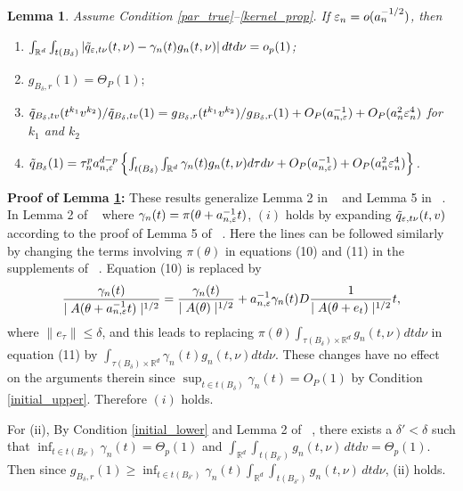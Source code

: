 \documentclass{article}
\newtheorem{lemma}{Lemma}
\begin{document}
\begin{lemma}\label{Alemma2} Assume Condition \ref{par_true}--\ref{kernel_prop}. If $\varepsilon_{n}=o(a_{n}^{-1/2})$, then 
	\begin{enumerate}
		\item[(i)] $\int_{\mathbb{R}^{d}}\int_{t(B_{\delta})}|\tilde{q}_{\varepsilon,t\nu}(t,\nu)-\gamma_{n}(t)g_{n}(t,\nu)|\,dtd\nu=o_{p}(1)$;
		\item[(ii)] $g_{B_{\delta},r}(1)=\Theta_{P}(1);$ 
		\item[(iii)] $\tilde{q}_{B_{\delta},tv}(t^{k_{1}}v^{k_{2}})/\tilde{q}_{B_{\delta},tv}(1)=g_{B_{\delta},r}(t^{k_{1}}v^{k_{2}})/g_{B_{\delta},r}(1)+O_{P}(a_{n,\varepsilon}^{-1})+O_{P}(a_{n}^{2}\varepsilon_{n}^{4})$
		for $k_{1}$ and $k_{2}$ 
		\item[(iv)] $\tilde{q}_{B_{\delta}}(1)=\tau_{n}^{p}a_{n,\varepsilon}^{d-p}\left\{ \int_{t(B_{\delta})}\int_{\mathbb{R}^{d}}\gamma_{n}(t)g_{n}(t,\nu)d\tau d\nu+O_{P}(a_{n,\varepsilon}^{-1})+O_{P}(a_{n}^{2}\varepsilon_{n}^{4})\right\} $. 
	\end{enumerate}\end{lemma}
{\bf Proof of Lemma \ref{Alemma2}:} 
	These results generalize Lemma 2 in ~\cite{Li2017} and Lemma 5 in
	~\cite{Li2016}. In Lemma 2 of ~\cite{Li2017} where $\gamma_{n}(t)=\pi(\theta+a_{n,\varepsilon}^{-1}t)$,
	$(i)$ holds by expanding $\tilde{q}_{\varepsilon,t\nu}(t,v)$ according to
	the proof of Lemma 5 of ~\cite{Li2016}. Here the lines can be followed
	similarly by changing the terms involving $\pi(\theta)$ in equations
	(10) and (11) in the supplements of ~\cite{Li2016}. Equation (10)
	is replaced by 
	\[
	\frac{\gamma_{n}(t)}{\mid A(\theta+a_{n,\varepsilon}^{-1}t)\mid^{1/2}}=\frac{\gamma_{n}(t)}{\mid A(\theta)\mid^{1/2}}+a_{n,\varepsilon}^{-1}\gamma_{n}(t)D\frac{1}{\mid A(\theta+e_{t})\mid^{1/2}}t,
	\]
	where $\|e_{\tau}\|\leq\delta$, and this leads to replacing $\pi(\theta)\int_{\tau(B_{\delta})\times\mathbb{R}^{d}}g_{n}(t,\nu)dtd\nu$
	in equation (11) by $\int_{\tau(B_{\delta})\times\mathbb{R}^{d}}\gamma_{n}(t)g_{n}(t,\nu)dtd\nu$.
	These changes have no effect on the arguments therein since $\sup_{t\in t(B_{\delta})}\gamma_{n}(t)=O_{P}(1)$
	by Condition \ref{initial_upper}. Therefore $(i)$ holds.
	
	For (ii), By Condition \ref{initial_lower} and Lemma 2 of ~\cite{Li2017}, there exists a $\delta'<\delta$
	such that $\inf_{t\in t(B_{\delta'})}\gamma_{n}(t)=\Theta_{p}(1)$
	and $\int_{\mathbb{R}^{d}}\int_{t(B_{\delta'})}g_{n}(t,\nu)\,dtdv=\Theta_{p}(1)$.
	Then since $g_{B_{\delta},r}(1)\geq\inf_{t\in t(B_{\delta'})}\gamma_{n}(t)\int_{\mathbb{R}^{d}}\int_{t(B_{\delta'})}g_{n}(t,\nu)\,dtd\nu$,
	(ii) holds.
	
\end{document}
